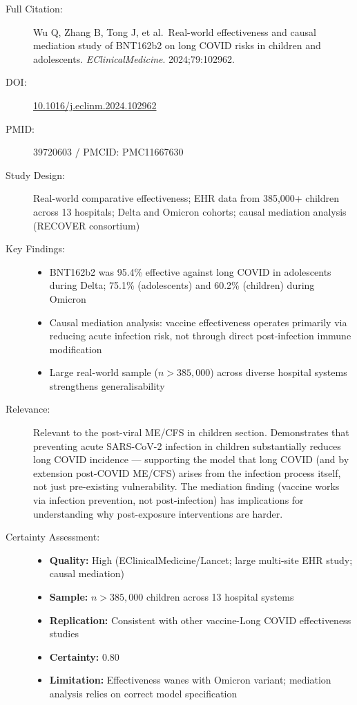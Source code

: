\begin{description}
    \item[Full Citation:] Wu Q, Zhang B, Tong J, et al.\ Real-world effectiveness and causal mediation study of BNT162b2 on long COVID risks in children and adolescents. \textit{EClinicalMedicine}. 2024;79:102962. \cite{Wu2024LongCovidChildren}
    \item[DOI:] \href{https://doi.org/10.1016/j.eclinm.2024.102962}{10.1016/j.eclinm.2024.102962}
    \item[PMID:] 39720603 / PMCID: PMC11667630
    \item[Study Design:] Real-world comparative effectiveness; EHR data from 385,000+ children across 13 hospitals; Delta and Omicron cohorts; causal mediation analysis (RECOVER consortium)
    \item[Key Findings:]
    \begin{itemize}
        \item BNT162b2 was 95.4\% effective against long COVID in adolescents during Delta; 75.1\% (adolescents) and 60.2\% (children) during Omicron
        \item Causal mediation analysis: vaccine effectiveness operates primarily via reducing acute infection risk, not through direct post-infection immune modification
        \item Large real-world sample ($n>385{,}000$) across diverse hospital systems strengthens generalisability
    \end{itemize}
    \item[Relevance:] Relevant to the post-viral ME/CFS in children section. Demonstrates that preventing acute SARS-CoV-2 infection in children substantially reduces long COVID incidence --- supporting the model that long COVID (and by extension post-COVID ME/CFS) arises from the infection process itself, not just pre-existing vulnerability. The mediation finding (vaccine works via infection prevention, not post-infection) has implications for understanding why post-exposure interventions are harder.
    \item[Certainty Assessment:]
    \begin{itemize}
        \item \textbf{Quality:} High (EClinicalMedicine/Lancet; large multi-site EHR study; causal mediation)
        \item \textbf{Sample:} $n > 385{,}000$ children across 13 hospital systems
        \item \textbf{Replication:} Consistent with other vaccine-Long COVID effectiveness studies
        \item \textbf{Certainty:} 0.80
        \item \textbf{Limitation:} Effectiveness wanes with Omicron variant; mediation analysis relies on correct model specification
    \end{itemize}
\end{description}

